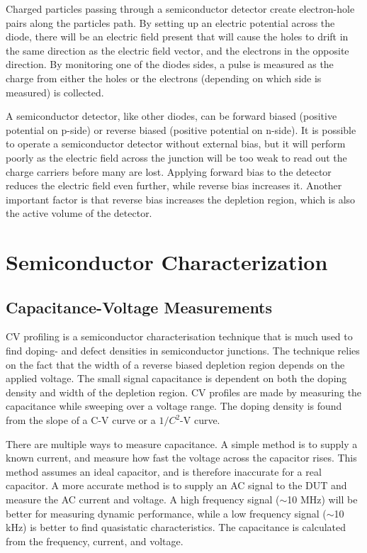 \documentclass[../main/thesis.tex]{subfiles}
\begin{document}
Charged particles passing through a semiconductor detector create electron-hole pairs along the particles path. By setting up an electric potential across the diode, there will be an electric field present that will cause the holes to drift in the same direction as the electric field vector, and the electrons in the opposite direction. By monitoring one of the diodes sides, a pulse is measured as the charge from either the holes or the electrons (depending on which side is measured) is collected. 

A semiconductor detector, like other diodes, can be forward biased (positive potential on p-side) or reverse biased (positive potential on n-side). It is possible to operate a semiconductor detector without external bias, but it will perform poorly as the electric field across the junction will be too weak to read out the charge carriers before many are lost. Applying forward bias to the detector reduces the electric field even further, while reverse bias increases it. Another important factor is that reverse bias increases the depletion region, which is also the active volume of the detector. \citep[chap. 11]{Knoll}




\section{Semiconductor Characterization}
\label{t-char}

\subsection{Capacitance-Voltage Measurements}
\label{t-cv}
\gls{CV} profiling is a semiconductor characterisation technique that is much used to find doping- and defect densities in semiconductor junctions. The technique relies on the fact that the width of a reverse biased depletion region depends on the applied voltage. The small signal capacitance is dependent on both the doping density and width of the depletion region. \gls{CV} profiles are made by measuring the capacitance while sweeping over a voltage range. The doping density is found from the slope of a C-V curve or a $1/C^2$-V curve. \citep[chap. 2]{Schroder}

There are multiple ways to measure capacitance. A simple method is to supply a known current, and measure how fast the voltage across the capacitor rises. This method assumes an ideal capacitor, and is therefore inaccurate for a real capacitor. A more accurate method is to supply an AC signal to the \gls{DUT} and measure the AC current and voltage. A high frequency signal ($\sim$10 MHz) will be better for measuring dynamic performance, while a low frequency signal ($\sim$10 kHz) is better to find quasistatic characteristics. The capacitance is calculated from the frequency, current, and voltage. 
\end{document}
